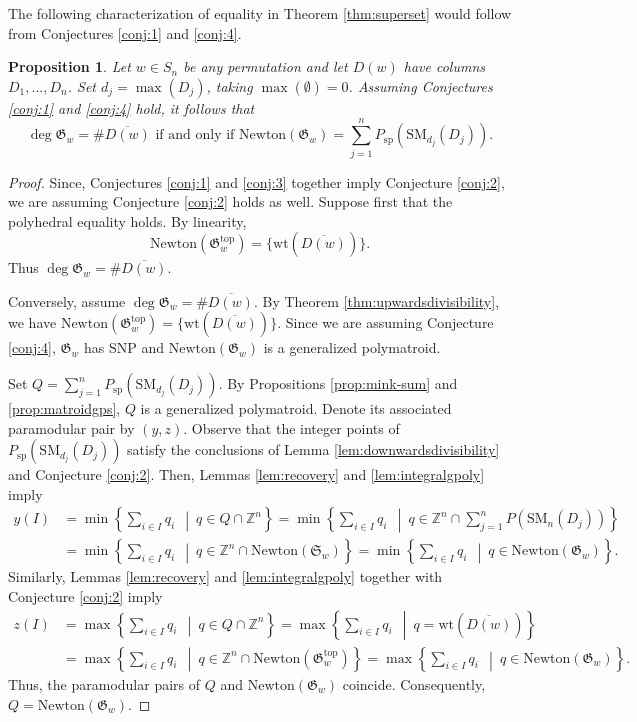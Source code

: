 \documentclass{amsart}
\newtheorem{proposition}[theorem]{Proposition}
\theoremstyle{definition}
\theoremstyle{named}
\begin{document}
	The following characterization of equality in Theorem \ref{thm:superset} would follow from Conjectures \ref{conj:1} and \ref{conj:4}.
	\begin{proposition}
		\label{prop:converse}
		Let $w\in S_n$ be any permutation and let $D(w)$ have columns $D_1,\ldots,D_n$. Set $d_j = \max(D_j)$, taking $\max(\emptyset)=0$. Assuming Conjectures \ref{conj:1} and \ref{conj:4} hold, it follows that 
		\[\deg \mathfrak{G}_w=\#\overline{D(w)} \mbox{ if and only if } \mathrm{Newton}(\mathfrak{G}_w) = \sum_{j=1}^n P_{\mathrm{sp}}(\mathrm{SM}_{d_j}(D_j)).\]
	\end{proposition}
	\begin{proof}
		Since, Conjectures \ref{conj:1} and \ref{conj:3} together imply Conjecture \ref{conj:2}, we are assuming Conjecture \ref{conj:2} holds as well. Suppose first that the polyhedral equality holds. By linearity,
		\[\mathrm{Newton}(\mathfrak{G}_w^{\mathrm{top}}) = \{\mathrm{wt}(\overline{D(w)})\}. \]
		Thus $\deg\mathfrak{G}_w=\#\overline{D(w)}$.
		
		Conversely, assume $\deg\mathfrak{G}_w = \#\overline{D(w)}$. By Theorem \ref{thm:upwardsdivisibility}, we have $\mathrm{Newton}(\mathfrak{G}_w^{\mathrm{top}}) = \{\mathrm{wt}(\overline{D(w)})\}$. 
		Since we are assuming Conjecture \ref{conj:4}, $\mathfrak{G}_w$ has SNP and $\mathrm{Newton}(\mathfrak{G}_w)$ is a generalized polymatroid. 
				
		Set $Q=\sum_{j=1}^n P_{\mathrm{sp}}(\mathrm{SM}_{d_j}(D_j))$. By Propositions \ref{prop:mink-sum} and \ref{prop:matroidgps}, $Q$ is a generalized polymatroid. 
		Denote its associated paramodular pair by $(y,z)$. Observe that the integer points of $P_{\mathrm{sp}}(\mathrm{SM}_{d_j}(D_j))$ satisfy the conclusions of Lemma \ref{lem:downwardsdivisibility} and Conjecture \ref{conj:2}. Then, Lemmas \ref{lem:recovery} and \ref{lem:integralgpoly} imply
		\begin{align*}
		y(I) &= \min\left\{\sum_{i\in I}q_i\ \ \middle|\ q\in Q\cap \mathbb{Z}^n \right\} 
		  =\min\left\{\sum_{i\in I}q_i\ \ \middle|\ q\in \mathbb{Z}^n \cap \sum_{j=1}^nP(\mathrm{SM}_n(D_j)) \right\}\\
		  &=\min\left\{\sum_{i\in I}q_i\ \ \middle|\ q\in \mathbb{Z}^n \cap \mathrm{Newton}(\mathfrak{S}_w)\right\}
		  =\min\left\{\sum_{i\in I}q_i\ \ \middle|\ q\in \mathrm{Newton}(\mathfrak{G}_w) \right\}.
		\end{align*}
		Similarly, Lemmas \ref{lem:recovery} and \ref{lem:integralgpoly} together with Conjecture \ref{conj:2} imply
		\begin{align*}
		z(I) &= \max\left\{\sum_{i\in I}q_i\ \ \middle|\ q\in Q\cap \mathbb{Z}^n\right\}
		   =\max\left\{\sum_{i\in I}q_i\ \ \middle|\ q=\mathrm{wt}(\overline{D(w)}) \right\}\\
		   &=\max\left\{\sum_{i\in I}q_i\ \ \middle|\ q\in \mathbb{Z}^n\cap \mathrm{Newton}(\mathfrak{G}_w^{\mathrm{top}}) \right\}
		   =\max\left\{\sum_{i\in I}q_i\ \ \middle|\ q\in \mathrm{Newton}(\mathfrak{G}_w) \right\}.
		\end{align*}
		Thus, the paramodular pairs of $Q$ and $\mathrm{Newton}(\mathfrak{G}_w)$ coincide. Consequently, $Q=\mathrm{Newton}(\mathfrak{G}_w)$.
	\end{proof}
\end{document}
